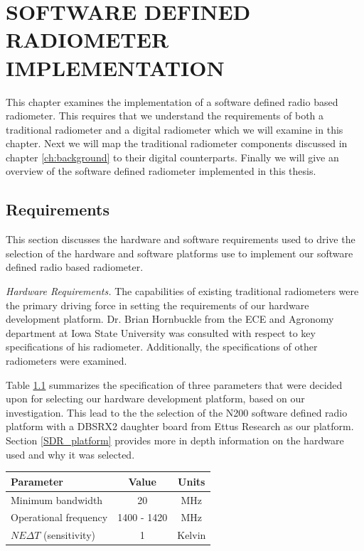 \chapter{SOFTWARE DEFINED RADIOMETER IMPLEMENTATION}\label{ch:implementation}

This chapter examines the implementation of a software defined radio based radiometer.  This requires that we understand the requirements of both a traditional radiometer and a digital radiometer which we will examine in this chapter.  Next we will map the traditional radiometer components discussed in chapter \ref{ch:background} to their digital counterparts.  Finally we will give an overview of the software defined radiometer implemented in this thesis.

\section{Requirements}\label{requirements}

This section discusses the hardware and software requirements used to drive the selection of the hardware and software platforms use to implement our software defined radio based radiometer.  

\emph{Hardware Requirements.}  The capabilities of existing traditional radiometers were the primary driving force in setting the requirements of our hardware development platform.  Dr. Brian Hornbuckle from the ECE and Agronomy department at Iowa State University was consulted with respect to key specifications of his radiometer.  Additionally, the specifications of other radiometers were examined. 

Table \ref{rad_performance} summarizes the specification of three parameters that were decided upon for selecting our hardware development platform, based on our investigation.  This lead to the the selection of the N200 software defined radio platform with a DBSRX2 daughter board from Ettus Research as our platform.  Section \ref{SDR_platform} provides more in depth information on the hardware used and why it was selected.

\begin{table}[h!tb] \centering
{}
\label{rad_performance}
\begin{tabular}{lcc} \hline
\textbf{Parameter} & \textbf{Value} & \textbf{Units} \\ \hline
Minimum bandwidth & 20 & MHz \\
Operational frequency & 1400 - 1420 & MHz \\
$NE\Delta T$ (sensitivity) & 1 & Kelvin \\ \hline
\end{tabular}
\end{table}

